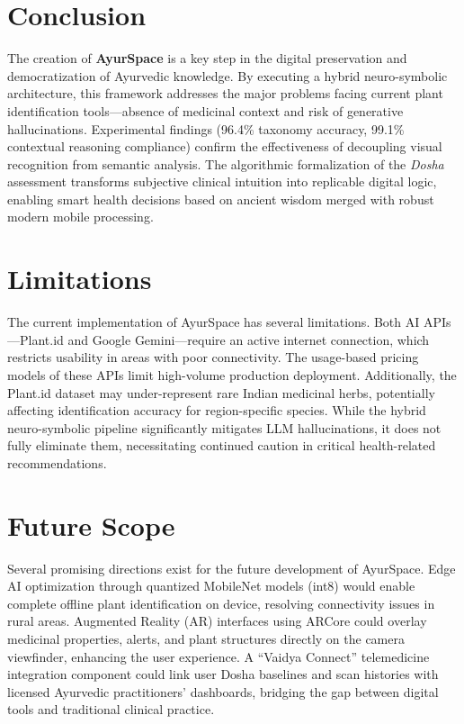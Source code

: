 \section{Conclusion}
The creation of \textbf{AyurSpace} is a key step in the digital preservation and
democratization of Ayurvedic knowledge. By executing a hybrid neuro-symbolic architecture,
this framework addresses the major problems facing current plant identification
tools---absence of medicinal context and risk of generative hallucinations. Experimental
findings (96.4\% taxonomy accuracy, 99.1\% contextual reasoning compliance) confirm the
effectiveness of decoupling visual recognition from semantic analysis. The algorithmic
formalization of the \textit{Dosha} assessment transforms subjective clinical intuition
into replicable digital logic, enabling smart health decisions based on ancient wisdom
merged with robust modern mobile processing.

\section{Limitations}
The current implementation of AyurSpace has several limitations. Both AI APIs---Plant.id and Google Gemini---require an active internet connection, which restricts usability in areas with poor connectivity. The usage-based pricing models of these APIs limit high-volume production deployment. Additionally, the Plant.id dataset may under-represent rare Indian medicinal herbs, potentially affecting identification accuracy for region-specific species. While the hybrid neuro-symbolic pipeline significantly mitigates LLM hallucinations, it does not fully eliminate them, necessitating continued caution in critical health-related recommendations.

\section{Future Scope}
Several promising directions exist for the future development of AyurSpace. Edge AI optimization through quantized MobileNet models (int8) would enable complete offline plant identification on device, resolving connectivity issues in rural areas. Augmented Reality (AR) interfaces using ARCore could overlay medicinal properties, alerts, and plant structures directly on the camera viewfinder, enhancing the user experience. A ``Vaidya Connect'' telemedicine integration component could link user Dosha baselines and scan histories with licensed Ayurvedic practitioners' dashboards, bridging the gap between digital tools and traditional clinical practice.
